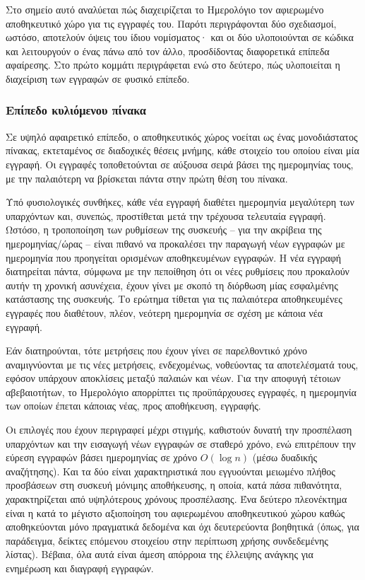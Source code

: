 Στο σημείο αυτό αναλύεται πώς διαχειρίζεται το Ημερολόγιο τον αφιερωμένο
αποθηκευτικό χώρο για τις εγγραφές του. Παρότι περιγράφονται δύο σχεδιασμοί,
ωστόσο, αποτελούν όψεις του ίδιου νομίσματος· και οι δύο υλοποιούνται σε κώδικα
και λειτουργούν ο ένας πάνω από τον άλλο, προσδίδοντας διαφορετικά επίπεδα
αφαίρεσης. Στο πρώτο κομμάτι περιγράφεται  ενώ στο δεύτερο, πώς υλοποιείται η
διαχείριση των εγγραφών σε φυσικό επίπεδο.

\subsubsection{Επίπεδο κυλιόμενου πίνακα}
Σε υψηλό αφαιρετικό επίπεδο, ο αποθηκευτικός χώρος νοείται ως ένας μονοδιάστατος
πίνακας, εκτεταμένος σε διαδοχικές θέσεις μνήμης, κάθε στοιχείο του οποίου είναι
μία εγγραφή. Οι εγγραφές τοποθετούνται σε αύξουσα σειρά βάσει της ημερομηνίας
τους, με την παλαιότερη να βρίσκεται πάντα στην πρώτη θέση του πίνακα.

Υπό φυσιολογικές συνθήκες, κάθε νέα εγγραφή διαθέτει ημερομηνία μεγαλύτερη των
υπαρχόντων και, συνεπώς, προστίθεται μετά την τρέχουσα τελευταία εγγραφή.
Ωστόσο, η τροποποίηση των ρυθμίσεων της συσκευής -- για την ακρίβεια της
ημερομηνίας\slash ώρας --  είναι πιθανό να προκαλέσει την παραγωγή νέων εγγραφών
με ημερομηνία που προηγείται ορισμένων αποθηκευμένων εγγραφών. Η νέα εγγραφή
διατηρείται πάντα, σύμφωνα με την πεποίθηση ότι οι νέες ρυθμίσεις που προκαλούν
αυτήν τη χρονική ασυνέχεια, έχουν γίνει με σκοπό τη διόρθωση μίας εσφαλμένης
κατάστασης της συσκευής. Το ερώτημα τίθεται για τις παλαιότερα αποθηκευμένες
εγγραφές που διαθέτουν, πλέον, νεότερη ημερομηνία σε σχέση με κάποια νέα
εγγραφή.

Εάν διατηρούνται, τότε μετρήσεις που έχουν γίνει σε παρελθοντικό χρόνο
αναμιγνύονται με τις νέες μετρήσεις, ενδεχομένως, νοθεύοντας τα αποτελέσματά
τους, εφόσον υπάρχουν αποκλίσεις μεταξύ παλαιών και νέων. Για την αποφυγή
τέτοιων αβεβαιοτήτων, το Ημερολόγιο απορρίπτει τις προϋπάρχουσες εγγραφές, η
ημερομηνία των οποίων έπεται κάποιας νέας, προς αποθήκευση, εγγραφής.

Οι επιλογές που έχουν περιγραφεί μέχρι στιγμής, καθιστούν δυνατή την προσπέλαση
υπαρχόντων και την εισαγωγή νέων εγγραφών σε σταθερό χρόνο, ενώ επιτρέπουν την
εύρεση εγγραφών βάσει ημερομηνίας σε χρόνο $O(\log n)$ (μέσω δυαδικής
αναζήτησης). Και τα δύο είναι χαρακτηριστικά που εγγυούνται μειωμένο πλήθος
προσβάσεων στη συσκευή μόνιμης αποθήκευσης, η οποία, κατά πάσα πιθανότητα,
χαρακτηρίζεται από υψηλότερους χρόνους προσπέλασης. Ένα δεύτερο πλεονέκτημα
είναι η κατά το μέγιστο αξιοποίηση του αφιερωμένου αποθηκευτικού χώρου καθώς
αποθηκεύονται μόνο πραγματικά δεδομένα και όχι δευτερεύοντα βοηθητικά (όπως, για
παράδειγμα, δείκτες επόμενου στοιχείου στην περίπτωση χρήσης συνδεδεμένης
λίστας).
Βέβαια, όλα αυτά είναι άμεση απόρροια της
έλλειψης ανάγκης για ενημέρωση και διαγραφή εγγραφών.

